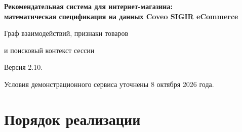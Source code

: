 \documentclass[12pt,a4paper]{article}
\theoremstyle{plainru}
\begin{document}
\begin{center}
{\Large\bfseries Рекомендательная система для интернет-магазина:\\[0.3em]
математическая спецификация на данных Coveo SIGIR eCommerce\par}
\vspace{0.7em}
{\large Граф взаимодействий, признаки товаров\par
и поисковый контекст сессии\par}
\vspace{0.7em}
{Версия 2.10.\par}
{Условия демонстрационного сервиса уточнены 8 октября 2026 года.\par}
\end{center}
\begin{abstract}
Первый вариант использует граф переходов, готовые векторы описаний
и изображений, поиск и ранжирование LambdaMART. Нейросетевое расширение
обучает товарные представления и намерения сессии.
Для каждого этапа определены входы, порядок обучения, проверка
и условия перехода к следующему этапу.
Бизнес-цель --- дополнительные сессии с покупкой на 1000 допущенных сессий.
Первый результат на Coveo --- охват зарегистрированных будущих покупок
первой выдачей среди сессий с такой покупкой. Полнота телеметрии
остаётся неизвестной; оценка по всем сессиям требует её подтверждения.
Данные позволяют измерить совпадение с историческими покупками;
причинный эффект требует рандомизированного эксперимента с показами.
Спецификация не содержит результатов обучения или нагрузочных измерений.
\end{abstract}

\section*{Порядок реализации}
\label{sec:reading-route}
\label{sec:first-run}\label{sec:stage-acceptance}
\end{document}
